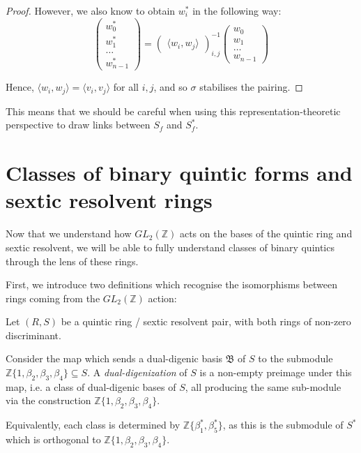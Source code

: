 \documentclass{report}
\begin{document}
\begin{proof}
However, we also know to obtain $w_i^*$ in the following way:
\begin{equation}
\begin{pmatrix}
w_0^* \\ w_1^* \\ \ldots \\ w_{n-1}^*
\end{pmatrix}
=
\begin{pmatrix}
\langle w_i,w_j \rangle
\end{pmatrix}^{-1}_{i,j}
\begin{pmatrix}
w_0 \\ w_1 \\ \ldots \\ w_{n-1}
\end{pmatrix}
\end{equation}

Hence, $\langle w_i,w_j \rangle = \langle v_i,v_j \rangle$ for all $i,j$, and so $\sigma$ stabilises the pairing.
\end{proof}

This means that we should be careful when using this representation-theoretic perspective to draw links between $S_f$ and $S_f^*$.

\section{Classes of binary quintic forms and sextic resolvent rings}

Now that we understand how $GL_2(\mathbb{Z})$ acts on the bases of the quintic ring and sextic resolvent, we will be able to fully understand classes of binary quintics through the lens of these rings.

First, we introduce two definitions which recognise the isomorphisms between rings coming from the $GL_2(\mathbb{Z})$ action:
\begin{definition}
Let $(R,S)$ be a quintic ring / sextic resolvent pair, with both rings of non-zero discriminant.

Consider the map which sends a dual-digenic basis $\mathfrak{B}$ of $S$ to the submodule $\mathbb{Z} \{ 1, \beta_2, \beta_3, \beta_4 \} \subseteq S$.  A \emph{dual-digenization} of $S$ is a non-empty preimage under this map, i.e. a class of dual-digenic bases of $S$, all producing the same sub-module via the construction $\mathbb{Z} \{ 1, \beta_2, \beta_3, \beta_4 \}$.

Equivalently, each class is determined by $\mathbb{Z} \{ \beta_1^*, \beta_5^* \}$, as this is the submodule of $S^*$ which is orthogonal to $\mathbb{Z} \{ 1, \beta_2, \beta_3, \beta_4 \}$.
\end{definition}
\end{document}
